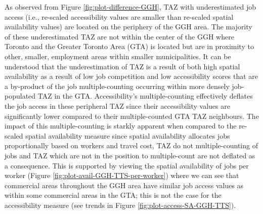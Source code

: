 \documentclass[]{elsarticle} %
\begin{document}
As observed from Figure \ref{fig:plot-difference-GGH}, TAZ with
underestimated job access (i.e., re-scaled accessibility values are
smaller than re-scaled spatial availability values) are located on the
periphery of the GGH area. The majority of these underestimated TAZ are
not within the center of the GGH where Toronto and the Greater Toronto
Area (GTA) is located but are in proximity to other, smaller, employment
areas within smaller municipalities. It can be understood that the
underestimation of TAZ is a result of both high spatial availability as
a result of low job competition and low accessibility scores that are a
by-product of the job multiple-counting occurring within more densely
job-populated TAZ in the GTA. Accessibility's multiple-counting
effectively deflates the job access in these peripheral TAZ since their
accessibility values are significantly lower compared to their
multiple-counted GTA TAZ neighbours. The impact of this
multiple-counting is starkly apparent when compared to the re-scaled
spatial availability measure since spatial availability allocates jobs
proportionally based on workers and travel cost, TAZ do not
multiple-counting of jobs and TAZ which are not in the position to
multiple-count are not deflated as a consequence. This is supported by
viewing the spatial availability of jobs per worker (Figure
\ref{fig:plot-avail-GGH-TTS-per-worker}) where we can see that
commercial areas throughout the GGH area have similar job access values
as within some commercial areas in the GTA; this is not the case for the
accessibility measure (see trends in Figure
\ref{fig:plot-access-SA-GGH-TTS}).
\end{document}
